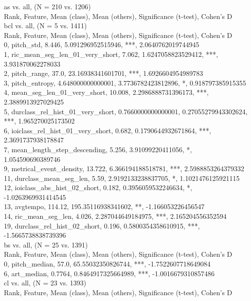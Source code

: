 as vs. all, (N = 210 vs. 1206)\\
Rank, Feature, Mean (class), Mean (others), Significance (t-test), Cohen's D\\
bcl vs. all, (N = 5 vs. 1411)\\
Rank, Feature, Mean (class), Mean (others), Significance (t-test), Cohen's D\\
0, pitch_std, 8.446, 5.091296952515946, ***, 2.0640762019744945\\
1, ric_mean_seg_len_01_very_short, 7.062, 1.6247058823529412, ***, 3.931870062278033\\
2, pitch_range, 37.0, 23.16938341601701, ***, 1.6926604954989783\\
3, pitch_entropy, 4.648000000000001, 3.7736782423812896, *, 0.918797385915355\\
4, mean_seg_len_01_very_short, 10.008, 2.2986888731396173, ***, 2.3889913927029425\\
5, durclass_rel_hist_01_very_short, 0.7660000000000001, 0.27055279943302624, ***, 1.965270025173502\\
6, ioiclass_rel_hist_01_very_short, 0.682, 0.1790644932671864, ***, 2.3691737938178847\\
7, mean_length_step_descending, 5.256, 3.91099220411056, *, 1.054590690389746\\
9, metrical_event_density, 13.722, 6.366194188518781, ***, 2.5988853264379332\\
11, durclass_mean_seg_len, 5.59, 2.9192133238837705, *, 1.1021476125921115\\
12, ioiclass_abs_hist_02_short, 0.182, 0.3956059532246634, *, -1.0263969931414545\\
13, avgtempo, 114.12, 195.35116938341602, **, -1.166053226456547\\
14, ric_mean_seg_len, 4.026, 2.287044649184975, ***, 2.165204556352594\\
19, durclass_rel_hist_02_short, 0.196, 0.5800354358610915, ***, -1.5665738838739396\\
bs vs. all, (N = 25 vs. 1391)\\
Rank, Feature, Mean (class), Mean (others), Significance (t-test), Cohen's D\\
0, pitch_median, 57.0, 65.55032350826744, ***, -1.7522607718649084\\
6, art_median, 0.7764, 0.8464917325664989, ***, -1.0016679310857486\\
cl vs. all, (N = 23 vs. 1393)\\
Rank, Feature, Mean (class), Mean (others), Significance (t-test), Cohen's D\\
